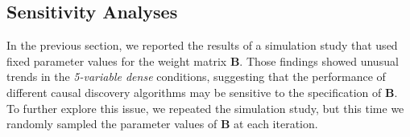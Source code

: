 \documentclass[twoside, 11pt]{article}
\newcommand*{\figref}[2][]{%
  \hyperref[{fig:#2}]{%
    Figure~\ref*{fig:#2}%
    \ifx\\#1\\%
    \else
      #1%
    \fi
  }%
}
\begin{document}

\subsection{Sensitivity Analyses} \label{sensitivity}
In the previous section, we reported the results of a simulation study that used fixed parameter values for the weight matrix $\mathbf{B}$. Those findings showed unusual trends in the \textit{5-variable dense} conditions, suggesting that the performance of different causal discovery algorithms may be sensitive to the specification of $\mathbf{B}$. 
To further explore this issue, we repeated the simulation study, but this time we randomly sampled the parameter values of $\mathbf{B}$ at each iteration. 
\end{document}
